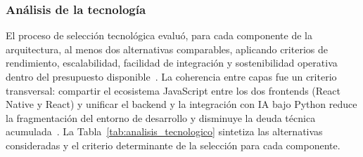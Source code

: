 				\subsubsection{Análisis de la tecnología}
					El proceso de selección tecnológica evaluó, para cada componente de la arquitectura, al menos dos alternativas comparables, aplicando criterios de rendimiento, escalabilidad, facilidad de integración y sostenibilidad operativa dentro del presupuesto disponible~\cite{Kleppmann2017,Fowler2002}. La coherencia entre capas fue un criterio transversal: compartir el ecosistema JavaScript entre los dos frontends (React Native y React) y unificar el backend y la integración con IA bajo Python reduce la fragmentación del entorno de desarrollo y disminuye la deuda técnica acumulada~\cite{Fowler2002}. La Tabla~\ref{tab:analisis_tecnologico} sintetiza las alternativas consideradas y el criterio determinante de la selección para cada componente.
					
